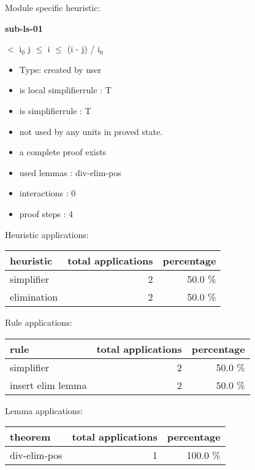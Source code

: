 \documentclass[a4paper]{article}
\begin{document}
Module specific heuristic:

\pagebreak

{\LARGE\bf sub-ls-01}\label{lemma-sub-ls-01}

\medskip

  $<$ $\mbox{i}_{0}$ \And j $\le$ i  $\le$ (i - j) / $\mbox{i}_{0}$

\begin{itemize}

\item Type: created by user

\item is local simplifierrule : T
\item is simplifierrule : T
\item not used by any units in proved state.
\item       a complete proof exists
\item       used lemmas  : div-elim-pos
\item       interactions : 0
\item       proof steps  : 4
\end{itemize}

\medskip


Heuristic applications:

\begin{supertabular}{l|r|r}
heuristic	& total applications & percentage \\ \hline
simplifier & 2 & 50.0 \% \\
elimination & 2 & 50.0 \% \\

\end{supertabular}

Rule applications:

\begin{supertabular}{l|r|r}
rule	        & total applications & percentage \\ \hline
simplifier & 2 & 50.0 \% \\
insert elim lemma & 2 & 50.0 \% \\

\end{supertabular}

Lemma applications:

\begin{supertabular}{l|r|r}
theorem	        & total applications & percentage \\ \hline
div-elim-pos & 1 & 100.0 \% \\

\end{supertabular}
\end{document}

